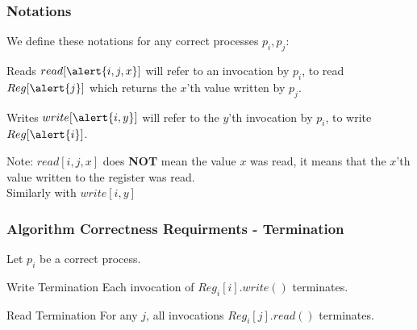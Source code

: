 \begin{frame}
    \frametitle{Notations}
    We define these notations for any correct processes $p_i, p_j$:
    \begin{block}{Reads}
        $read[\alert{i,j,x}]$ will refer to an invocation by $p_i$, to read $Reg[\alert{j}]$
        which returns the \alert{$x$}'th value written by \alert{$p_j$}.
    \end{block}
    \begin{block}{Writes}
        $write[\alert{i,y}]$ will refer to the \alert{$y$}'th invocation by \alert{$p_i$}, to write $Reg[\alert{i}]$.
    \end{block}
    \pause
    Note: $read[i,j,x]$ does \textbf{NOT} mean the value $x$ was read,
    it means that the $x$'th value written to the register was read.\\
    Similarly with $write[i,y]$

\end{frame}
\begin{frame}
    \frametitle{Algorithm Correctness Requirments - Termination}
    Let $p_i$ be a correct process.
    \begin{block}{Write Termination}
        Each invocation of $Reg_i[i].write()$ terminates.
    \end{block}
    \begin{block}{Read Termination}
        For any $j$, all invocations $Reg_i[j].read()$ terminates.
    \end{block}
\end{frame}
